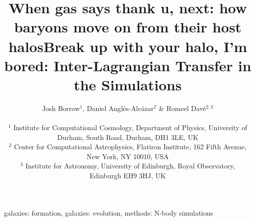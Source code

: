 \documentclass[fleqn,usenatbib]{mnras}
\title{When gas says thank u, next: how baryons move on from their host halos}
\title{Break up with your halo, I'm bored: Inter-Lagrangian Transfer in the \simba{} Simulations}
\author[Borrow et al.]{
Josh Borrow$^{1}$,
Daniel Angl\'es-Alc\'azar$^{2}$ \&
Romeel Dav\'e$^{2, 3}$
\\
\\$^1$ Institute for Computational Cosmology, Department of Physics, University of Durham, South Road, Durham, DH1 3LE, UK
\\$^2$ Center for Computational Astrophysics, Flatiron Institute, 162 Fifth Avenue, New York, NY 10010, USA 
\\$^3$ Institute for Astronomy, University of Edinburgh, Royal Observatory, Edinburgh EH9 3HJ, UK
}
\begin{document}
\maketitle

\begin{abstract}\end{abstract}

\begin{keywords}galaxies: formation, galaxies: evolution, methods: N-body simulations\end{keywords}











\end{document}
